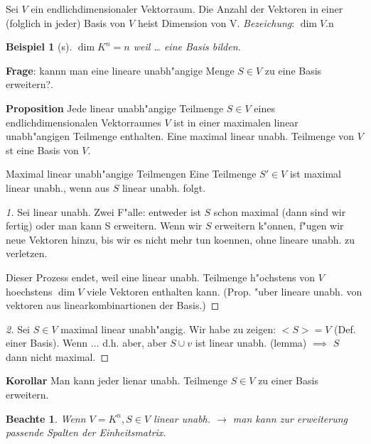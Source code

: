 \documentclass[11pt]{article}
\newtheorem{exa}{Beispiel}[section]
\newtheorem*{notte}{Beachte}
\begin{document}
\begin{definition}{}{}
Sei \(V\) ein endlichdimensionaler Vektorraum. Die Anzahl der Vektoren in einer
(folglich in jeder) Basis von \(V\) heist Dimension von V. \emph{Bezeichung}: \(\dim V\).n
\end{definition}

\begin{exa}[s] \label{}
\(\dim K^{n}=n\) weil \ldots{} eine Basis bilden. 
\end{exa}

\textbf{Frage}: kannn man eine lineare unabh"angige Menge \(S\in V\) zu eine Basis
erweitern?.

\textbf{Proposition} Jede linear unabh"angige Teilmenge \(S\in V\) eines
endlichdimensionalen Vektorraumes \(V\) ist in einer maximalen linear
unabh"angigen Teilmenge enthalten. Eine maximal linear unabh. Teilmenge von \(V\)
st eine Basis von \(V\).

\begin{definition}{Maximal linear unabh"angige Teilmengen}{}
Eine Teilmenge \(S'\in V\) ist maximal linear unabh., wenn aus \(S\)
linear unabh. folgt.
\end{definition}

\begin{proof}[1] \label{}
Sei linear unabh.
Zwei F"alle: entweder ist \(S\) schon maximal (dann sind wir fertig) oder man kann
S erweitern. Wenn wir \(S\) erweitern k"onnen, f"ugen wir neue Vektoren hinzu, bis
wir es nicht mehr tun koennen, ohne lineare unabh. zu verletzen.

Dieser Prozess endet, weil eine linear unabh. Teilmenge h"ochstens von \(V\)
hoechstens \(\dim V\) viele Vektoren enthalten kann. (Prop. "uber lineare unabh.
von vektoren aus linearkombinartionen der Basis.)
\end{proof}

\begin{proof}[2] \label{}
Sei \(S\in V\) maximal linear unabh"angig. Wir habe zu zeigen: \(<S>=V\) (Def. einer
Basis). Wenn $\ldots{}$ d.h. aber, aber \(S\cup {v}\) ist linear unabh. (lemma) $\implies$
\(S\) dann nicht maximal.
\end{proof}

\textbf{Korollar} Man kann jeder lienar unabh. Teilmenge \(S\in V\) zu einer Basis
erweitern.

\begin{notte}
Wenn \(V=K^n, S\in V\) linear unabh. \(\rightarrow\) man kann zur erweiterung passende
Spalten der Einheitsmatrix.
\end{notte}
\end{document}
